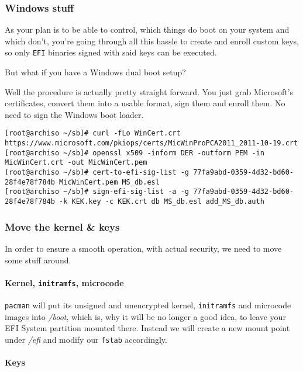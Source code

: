 \documentclass[10pt]{dustdoc}
\begin{document}
\subsubsection{Windows stuff}
\label{sec:windows-stuff}

As your plan is to be able to control, which things do boot on your system and which don’t, you’re going through all this hassle to create and enroll custom keys, so only \texttt{EFI} binaries signed with said keys can be executed.

But what if you have a Windows dual boot setup?

Well the procedure is actually pretty straight forward.
You just grab Microsoft’s certificates, convert them into a usable format, sign them and enroll them.
No need to sign the Windows boot loader.

\begin{verbatim}
[root@archiso ~/sb]# curl -fLo WinCert.crt https://www.microsoft.com/pkiops/certs/MicWinProPCA2011_2011-10-19.crt
[root@archiso ~/sb]# openssl x509 -inform DER -outform PEM -in MicWinCert.crt -out MicWinCert.pem
[root@archiso ~/sb]# cert-to-efi-sig-list -g 77fa9abd-0359-4d32-bd60-28f4e78f784b MicWinCert.pem MS_db.esl
[root@archiso ~/sb]# sign-efi-sig-list -a -g 77fa9abd-0359-4d32-bd60-28f4e78f784b -k KEK.key -c KEK.crt db MS_db.esl add_MS_db.auth
\end{verbatim}

\subsubsection{Move the kernel \& keys}
\label{sec:move-the-kernel-and-keys}

In order to ensure a smooth operation, with actual security, we need to move some stuff around.

\paragraph{Kernel, \texttt{initramfs}, microcode}
\label{par:kernel-initramfs-microcode}

\texttt{pacman} will put its unsigned and unencrypted kernel, \texttt{initramfs} and microcode images into \textit{/boot}, which is, why it will be no longer a good idea, to leave your EFI System partition mounted there.
Instead we will create a new mount point under \textit{/efi} and modify our \texttt{fstab} accordingly.

\paragraph{Keys}
\label{par:keys}
\end{document}
